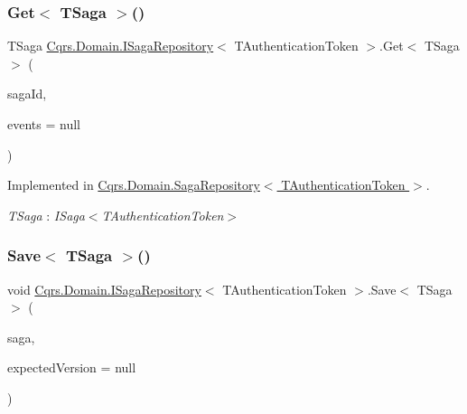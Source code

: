 \subsubsection{\texorpdfstring{Get$<$ T\+Saga $>$()}{Get< TSaga >()}}
{\footnotesize\ttfamily T\+Saga \hyperlink{interfaceCqrs_1_1Domain_1_1ISagaRepository}{Cqrs.\+Domain.\+I\+Saga\+Repository}$<$ T\+Authentication\+Token $>$.Get$<$ T\+Saga $>$ (\begin{DoxyParamCaption}\item[{Guid}]{saga\+Id,  }\item[{I\+List$<$ \hyperlink{interfaceCqrs_1_1Events_1_1ISagaEvent}{I\+Saga\+Event}$<$ T\+Authentication\+Token $>$$>$}]{events = {\ttfamily null} }\end{DoxyParamCaption})}



Implemented in \hyperlink{classCqrs_1_1Domain_1_1SagaRepository_a1b80ecc2a5719d1681ca5d182a252120_a1b80ecc2a5719d1681ca5d182a252120}{Cqrs.\+Domain.\+Saga\+Repository$<$ T\+Authentication\+Token $>$}.

\begin{Desc}
\item[Type Constraints]\begin{description}
\item[{\em T\+Saga} : {\em I\+Saga$<$T\+Authentication\+Token$>$}]\end{description}
\end{Desc}
\mbox{\label{interfaceCqrs_1_1Domain_1_1ISagaRepository_ad539cdc70f3168d0335c9510742e25cd_ad539cdc70f3168d0335c9510742e25cd}} 
\subsubsection{\texorpdfstring{Save$<$ T\+Saga $>$()}{Save< TSaga >()}}
{\footnotesize\ttfamily void \hyperlink{interfaceCqrs_1_1Domain_1_1ISagaRepository}{Cqrs.\+Domain.\+I\+Saga\+Repository}$<$ T\+Authentication\+Token $>$.Save$<$ T\+Saga $>$ (\begin{DoxyParamCaption}\item[{T\+Saga}]{saga,  }\item[{int?}]{expected\+Version = {\ttfamily null} }\end{DoxyParamCaption})}



